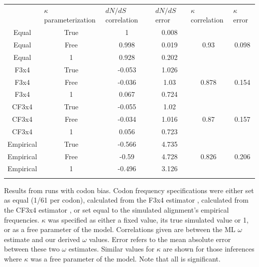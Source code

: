 \documentclass[11pt]{article}
\makeatletter
\newcommand{\customlabel}[2]{%
\protected@write \@auxout {}{\string \newlabel {#1}{{#2}{\thepage}{}{}{}}}}
\makeatother
\begin{document}
\begin{table}[htbp]
\customlabel{tab:tabS1}{tabS1}
\begin{tabular}{c c c c c c}
\hline\noalign{\smallskip}
\multicolumn{1}{l}{Codon frequencies} & \multicolumn{1}{l}{$\kappa$ parameterization} & \multicolumn{1}{l}{$dN/dS$ correlation} &\multicolumn{1}{l}{$dN/dS$ error} & \multicolumn{1}{l}{$\kappa$ correlation} &\multicolumn{1}{l}{$\kappa$ error} \\
Equal & True & 1 & 0.008 &   &   \\ 
Equal & Free & 0.998 & 0.019 & 0.93 & 0.098 \\ 
Equal & 1 & 0.928 & 0.202 &   &   \\ 
\hline\noalign{\smallskip}
F3x4 & True & -0.053 & 1.026 &   &   \\ 
F3x4 & Free & -0.036 & 1.03 & 0.878 & 0.154 \\ 
F3x4 & 1 & 0.067 & 0.724 &   &   \\ 
\hline\noalign{\smallskip}
CF3x4 & True & -0.055 & 1.02 &   &   \\ 
CF3x4 & Free & -0.034 & 1.016 & 0.87 & 0.157 \\ 
CF3x4 & 1 & 0.056 & 0.723 &   &   \\ 
\hline\noalign{\smallskip}
Empirical & True & -0.566 & 4.735 &   &   \\ 
Empirical & Free & -0.59 & 4.728 & 0.826 & 0.206 \\ 
Empirical & 1 & -0.496 & 3.126 &   &   \\ 
\noalign{\smallskip}\hline\noalign{\smallskip}
\end{tabular}
\newline
Results from runs with codon bias. Codon frequency specifications were either set as equal (1/61 per codon), calculated from the F3x4 estimator \cite{MuseGaut1994}, calculated from the CF3x4 estimator \cite{Pond2010}, or set equal to the simulated alignment's empirical frequencies. $\kappa$ was specified as either a fixed value, its true simulated value or 1, or as a free parameter of the model. Correlations given are between the ML $\omega$ estimate and our derived $\omega$ values. Error refers to the mean absolute error between these two $\omega$ estimates. Similar values for $\kappa$ are shown for those inferences where $\kappa$ was a free parameter of the model. Note that all is significant.
\end{table}	

\clearpage
\end{document}
